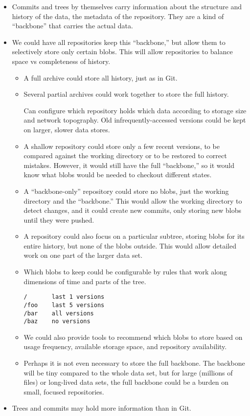 \documentclass[a4paper]{article}
\begin{document}
\begin{itemize}
\item
  Commits and trees by themselves carry information about the structure
  and history of the data, the metadata of the repository. They are a
  kind of ``backbone'' that carries the actual data.
\item
  We could have all repositories keep this ``backbone,'' but allow them
  to selectively store only certain blobs. This will allow repositories
  to balance space vs completeness of history.

  \begin{itemize}
  \item
    A full archive could store all history, just as in Git.
  \item
    Several partial archives could work together to store the full history.

    Can configure which repository holds which data according to storage size
    and network topography. Old infrequently-accessed versions could be kept on
    larger, slower data stores.
  \item
    A shallow repository could store only a few recent versions, to be
    compared against the working directory or to be restored to correct
    mistakes. However, it would still have the full ``backbone,'' so it
    would know what blobs would be needed to checkout different states.
  \item
    A ``backbone-only'' repository could store no blobs, just the
    working directory and the ``backbone.'' This would allow the working
    directory to detect changes, and it could create new commits, only
    storing new blobs until they were pushed.
  \item
    A repository could also focus on a particular subtree, storing blobs
    for its entire history, but none of the blobs outside. This would
    allow detailed work on one part of the larger data set.
  \item
    Which blobs to keep could be configurable by rules that work along
    dimensions of time and parts of the tree.

\begin{verbatim}
/       last 1 versions
/foo    last 5 versions
/bar    all versions
/baz    no versions
\end{verbatim}
  \item
    We could also provide tools to recommend which blobs to store based
    on usage frequency, available storage space, and repository
    availability.
  \item
    Perhaps it is not even necessary to store the full backbone. The
    backbone will be tiny compared to the whole data set, but for large
    (millions of files) or long-lived data sets, the full backbone could
    be a burden on small, focused repositories.
  \end{itemize}
\item
  Trees and commits may hold more information than in Git.


\end{itemize}
\end{document}
